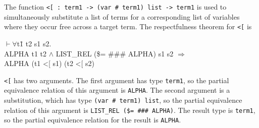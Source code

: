 \documentclass[envcountsame,runningheads]{llncs}
\newcommand{\quotient}{partial equivalence}
\begin{document}
The function {\tt <[ : term1 -> (var \# term1) list -> term1}
is used to simultaneously substitute a list of terms
for a corresponding list of variables
where they occur free across a target term.
The respectfulness theorem for {\tt <[} is
{\tt \begin{tabbing}
\hspace{5.5mm}
    $\vdash \forall$t\=1 t2 s1 s2. \\
\>       ALPHA t1 t2 $\wedge$ LIST\_REL (\$= \#\#\# ALPHA) s1 s2 $\Rightarrow$ \\
\>       ALPHA (t1 <[ s1) (t2 <[ s2)
\end{tabbing}}
{\tt <[} has two arguments.
The first argument has type {\tt term1},
so the \quotient{} relation of this argument is {\tt ALPHA}.
The second argument is a substitution, which has type {\tt (var \# term1) list},
so the \quotient{} relation of this argument is {\tt LIST\_REL (\$= \#\#\# ALPHA)}.
The result type is {\tt term1}, so the \quotient{} relation for the
result is {\tt ALPHA}. 
\end{document}
